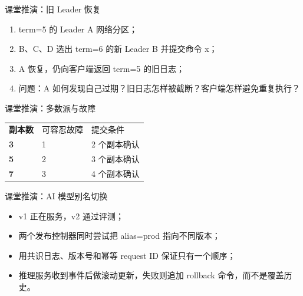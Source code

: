 \documentclass[UTF8,fontset=none,aspectratio=169,10pt]{beamer}
\begin{document}

\begin{frame}{课堂推演：旧 Leader 恢复}
\begin{enumerate}
  \item term=5 的 Leader A 网络分区；
  \item B、C、D 选出 term=6 的新 Leader B 并提交命令 x；
  \item A 恢复，仍向客户端返回 term=5 的旧日志；
  \item 问题：A 如何发现自己过期？旧日志怎样被截断？客户端怎样避免重复执行？
\end{enumerate}
\end{frame}

\begin{frame}{课堂推演：多数派与故障}
\begin{tabularx}{\linewidth}{>{\bfseries}p{2.8cm}XX}
\toprule
副本数 & 可容忍故障 & 提交条件 \\
3 & 1 & 2 个副本确认 \\
5 & 2 & 3 个副本确认 \\
7 & 3 & 4 个副本确认 \\
\bottomrule
\end{tabularx}
\vfill
{}
\end{frame}

\begin{frame}{课堂推演：AI 模型别名切换}
\begin{itemize}
  \item v1 正在服务，v2 通过评测；
  \item 两个发布控制器同时尝试把 alias=prod 指向不同版本；
  \item 用共识日志、版本号和幂等 request ID 保证只有一个顺序；
  \item 推理服务收到事件后做滚动更新，失败则追加 rollback 命令，而不是覆盖历史。
\end{itemize}
\end{frame}

\end{document}
